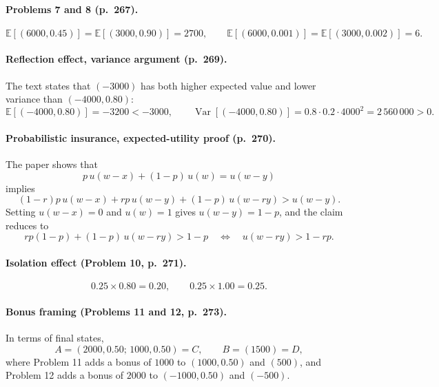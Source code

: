 \documentclass[11pt]{article}
\begin{document}
\paragraph{Problems 7 and 8 (p.~267).}
\begin{equation}\label{eq:p78-ev}
\mathbb{E}[(6000,0.45)] = \mathbb{E}[(3000,0.90)] = 2700,
\qquad
\mathbb{E}[(6000,0.001)] = \mathbb{E}[(3000,0.002)] = 6 .
\end{equation}

\paragraph{Reflection effect, variance argument (p.~269).}
The text states that $(-3000)$ has both higher expected value and lower variance
than $(-4000,0.80)$:
\begin{equation}\label{eq:reflect-var}
\mathbb{E}[(-4000,0.80)] = -3200 < -3000,
\qquad
\operatorname{Var}[(-4000,0.80)] = 0.8\cdot 0.2\cdot 4000^2 = 2\,560\,000 > 0 .
\end{equation}

\paragraph{Probabilistic insurance, expected-utility proof (p.~270).}
The paper shows that
\begin{equation}\label{eq:probins-premise}
p\,u(w-x) + (1-p)\,u(w) = u(w-y)
\end{equation}
implies
\begin{equation}\label{eq:probins-goal}
(1-r)p\,u(w-x) + rp\,u(w-y) + (1-p)\,u(w-ry) > u(w-y).
\end{equation}
Setting $u(w-x)=0$ and $u(w)=1$ gives $u(w-y)=1-p$, and the claim reduces to
\begin{equation}\label{eq:probins-reduce}
rp(1-p) + (1-p)\,u(w-ry) > 1-p
\quad\Longleftrightarrow\quad
u(w-ry) > 1 - rp .
\end{equation}

\paragraph{Isolation effect (Problem 10, p.~271).}
\begin{equation}\label{eq:p10-compound}
0.25 \times 0.80 = 0.20, \qquad 0.25 \times 1.00 = 0.25 .
\end{equation}

\paragraph{Bonus framing (Problems 11 and 12, p.~273).}
In terms of final states,
\begin{equation}\label{eq:p1112-identity}
A = (2000,0.50;\,1000,0.50) = C,
\qquad
B = (1500) = D,
\end{equation}
where Problem 11 adds a bonus of $1000$ to $(1000,0.50)$ and $(500)$, and Problem 12
adds a bonus of $2000$ to $(-1000,0.50)$ and $(-500)$.
\end{document}
